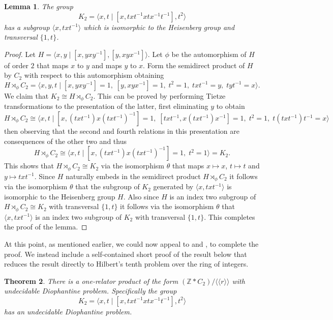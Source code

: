 \documentclass[11pt]{amsart}
\newtheorem{theorem}{Theorem}[section]
\newtheorem{lem}[theorem]{Lemma}
\theoremstyle{definition}
\numberwithin{theorem}{section}
\newcommand{\Z}{\mathbb{Z}}
\begin{document}
\begin{lem}
  \label{lem:Heisenberg-subgp}
  The group
  \[
    K_2 = \langle x, t \mid [x, txt^{-1} x tx^{-1} t^{-1}], t^2 \rangle
  \]
  has a subgroup \(\langle x, txt^{-1} \rangle\) which is isomorphic to
  the Heisenberg group and transversal \(\{1, t\}\).
\end{lem}

\begin{proof}
Let $H = \langle x, y \mid [x, yxy^{-1}], [y, xyx^{-1}]\rangle$.  
Let $\phi$ be the automorphism of $H$ of order \(2\) that maps $x$ to $y$ and maps $y$ to $x$. Form the semidirect product of $H$ by $C_2$ with respect to this automorphism obtaining 
\[
H  \rtimes_{\phi} C_2 = 
\langle 
x, y, t \mid [x, yxy^{-1}]=1, \; [y, xyx^{-1}]=1, \; t^2=1, \; txt^{-1} = y, \; tyt^{-1}=x
\rangle.
\]         
We claim that $K_2 \cong H  \rtimes_{\phi} C_2 $. This can be proved by performing Tietze transformations to the presentation of the latter, first eliminating $y$ to obtain    
\[
H  \rtimes_{\phi} C_2 \cong 
\langle 
x, t \mid [x, (txt^{-1} )x(txt^{-1} )^{-1}]=1, \; [txt^{-1} , x(txt^{-1} )x^{-1}]=1, \; t^2=1, \; t(txt^{-1} )t^{-1}=x
\rangle
\] 
then observing that the second and fourth relations in this presentation are consequences of the other two and thus   
\[
H  \rtimes_{\phi} C_2 \cong  
\langle 
x, t \mid [x, (txt^{-1} )x(txt^{-1} )^{-1}]=1, \; t^2=1
\rangle = K_2.   
\] 
This shows that $H  \rtimes_{\phi} C_2 \cong K_2$ via the isomorphism $\theta$ that maps  $x \mapsto x$, $t \mapsto t$ and $y \mapsto txt^{-1}$. Since $H$ naturally embeds in the semidirect product $H  \rtimes_{\phi} C_2$ it follows via the isomorphism $\theta$ that the subgroup of $K_2$ generated by $\langle x, txt^{-1} \rangle$ is isomorphic to the Heisenberg group $H$. 
Also since $H$ is an index two subgroup of $H  \rtimes_{\phi} C_2 \cong K_2$ with transversal $\{1, t \}$ it follows via the isomorphism $\theta$ that $\langle x, txt^{-1} \rangle$ is an index two subgroup of $K_2$ with transversal $\{1, t\}$.        
This completes the proof of the lemma. 
\end{proof}

At this point, as mentioned earlier, we could now appeal to \cite[Corollary 4.29]{Garreta2020} and \cite{Levent2026, koymans2024hilbert}, to complete the proof. We instead include a self-contained short proof of the result below that reduces the result directly to Hilbert's tenth problem over the ring of integers.

\begin{theorem}
There is a one-relator product of the form $(\Z \ast C_2) / \langle \langle r \rangle \rangle$ with undecidable  
Diophantine problem. Specifically the group
  \[
    K_2 = \langle x, t \mid [x, txt^{-1} x tx^{-1} t^{-1}], t^2 \rangle
  \]
  has an undecidable Diophantine problem.
\end{theorem}
\end{document}
